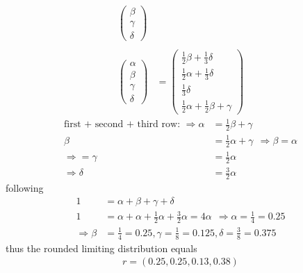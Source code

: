 \documentclass[a4paper,11pt]{article}
\begin{document}
\begin{itemize}
\begin{align*}
\begin{pmatrix}
                    \beta \\
                    \gamma \\
                    \delta
                \end{pmatrix} 
                \\
                \\
                \begin{pmatrix}
                    \alpha \\
                    \beta \\
                    \gamma \\
                    \delta
                \end{pmatrix} 
                &=
                \begin{pmatrix}
                    \frac{1}{2} \beta + \frac{1}{3} \delta \\
                    \frac{1}{2} \alpha + \frac{1}{3} \delta \\
                    \frac{1}{3} \delta \\
                    \frac{1}{2} \alpha + \frac{1}{2} \beta + \gamma
                \end{pmatrix} 
            \end{align*}
            \begin{align*}
                \text{first + second + third row: } \Rightarrow \alpha &= \frac{1}{2} \beta + \gamma
                \\
                \beta &= \frac{1}{2} \alpha + \gamma
                \ \ \Rightarrow \beta = \alpha
                \\[0.3 cm]
                \Rightarrow = \gamma &= \frac{1}{2} \alpha 
                \\[0.3 cm]
                \Rightarrow \delta &= \frac{3}{2} \alpha
            \end{align*}
            following
            \begin{align*} 
                1 &= \alpha + \beta + \gamma + \delta 
                \\
                1 &= \alpha + \alpha + \frac{1}{2} \alpha + \frac{3}{2} \alpha = 4 \alpha \ \ \Rightarrow \alpha = \frac{1}{4} = 0.25
                \\
                \Rightarrow \beta &= \frac{1}{4} = 0.25, \gamma = \frac{1}{8} = 0.125, \delta = \frac{3}{8} = 0.375
            \end{align*}
            thus the rounded limiting distribution equals
            \begin{align*} 
                r = (0.25, 0.25, 0.13, 0.38)
            \end{align*}
\end{itemize}
\end{document}
